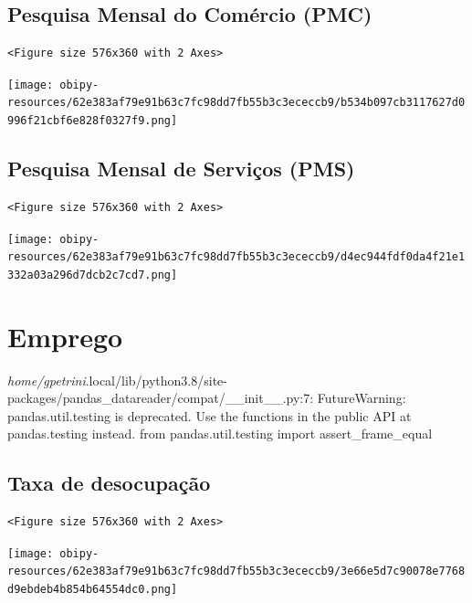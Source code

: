 \documentclass[11pt]{article}
\begin{document}
\subsection{Pesquisa Mensal do Comércio (PMC)}
\label{sec:orgddcfd29}

\begin{verbatim}
<Figure size 576x360 with 2 Axes>
\end{verbatim}


\begin{center}
\texttt{[image: obipy-resources/62e383af79e91b63c7fc98dd7fb55b3c3ececcb9/b534b097cb3117627d0996f21cbf6e828f0327f9.png]}
\end{center}


\subsection{Pesquisa Mensal de Serviços (PMS)}
\label{sec:org3cdd0d6}

\begin{verbatim}
<Figure size 576x360 with 2 Axes>
\end{verbatim}


\begin{center}
\texttt{[image: obipy-resources/62e383af79e91b63c7fc98dd7fb55b3c3ececcb9/d4ec944fdf0da4f21e1332a03a296d7dcb2c7cd7.png]}
\end{center}

\section{Emprego}
\label{sec:org09b3b2c}

\emph{home/gpetrini}.local/lib/python3.8/site-packages/pandas\_datareader/compat/\_\_init\_\_.py:7: FutureWarning: pandas.util.testing is deprecated. Use the functions in the public API at pandas.testing instead.
  from pandas.util.testing import assert\_frame\_equal


\subsection{Taxa de desocupação}
\label{sec:orge443466}

\begin{verbatim}
<Figure size 576x360 with 2 Axes>
\end{verbatim}


\begin{center}
\texttt{[image: obipy-resources/62e383af79e91b63c7fc98dd7fb55b3c3ececcb9/3e66e5d7c90078e7768d9ebdeb4b854b64554dc0.png]}
\end{center}
\end{document}
